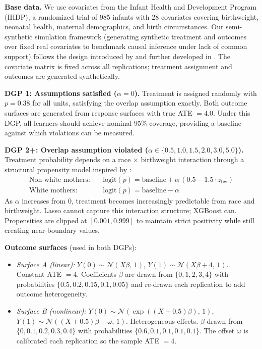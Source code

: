 \documentclass[12pt]{article}
\begin{document}
\noindent\textbf{Base data.} We use covariates from the Infant Health and Development Program (IHDP), a randomized trial of 985 infants with 28 covariates covering birthweight, neonatal health, maternal demographics, and birth circumstances. Our semi-synthetic simulation framework (generating synthetic treatment and outcomes over fixed real covariates to benchmark causal inference under lack of common support) follows the design introduced by \citet{Hill2011} and further developed in \citet{Hill2012}. The covariate matrix is fixed across all replications; treatment assignment and outcomes are generated synthetically.

\medskip
\noindent\textbf{DGP 1: Assumptions satisfied ($\alpha = 0$).} Treatment is assigned randomly with $p = 0.38$ for all units, satisfying the overlap assumption exactly. Both outcome surfaces are generated from \citet{Hill2011} response surfaces with true ATE $= 4.0$. Under this DGP, all learners should achieve nominal 95\% coverage, providing a baseline against which violations can be measured.

\medskip
\noindent\textbf{DGP 2+: Overlap assumption violated ($\alpha \in \{0.5, 1.0, 1.5, 2.0, 3.0, 5.0\}$).} Treatment probability depends on a race $\times$ birthweight interaction through a structural propensity model inspired by \citet{Hill2011}:
\begin{align*}
  \text{Non-white mothers:} &\quad \mathrm{logit}(p) = \text{baseline} + \alpha\,(0.5 - 1.5 \cdot z_{\text{bw}}) \\
  \text{White mothers:} &\quad \mathrm{logit}(p) = \text{baseline} - \alpha
\end{align*}
As $\alpha$ increases from 0, treatment becomes increasingly predictable from race and birthweight. Lasso cannot capture this interaction structure; XGBoost can. Propensities are clipped at $[0.001, 0.999]$ to maintain strict positivity while still creating near-boundary values.

\medskip
\noindent\textbf{Outcome surfaces} (used in both DGPs):

\begin{itemize}
  \item \emph{Surface A (linear):} $Y(0) \sim \mathcal{N}(X\beta,\, 1)$,\; $Y(1) \sim \mathcal{N}(X\beta + 4,\, 1)$. Constant ATE $= 4$. Coefficients $\beta$ are drawn from $\{0, 1, 2, 3, 4\}$ with probabilities $\{0.5, 0.2, 0.15, 0.1, 0.05\}$ and re-drawn each replication to add outcome heterogeneity.

  \item \emph{Surface B (nonlinear):} $Y(0) \sim \mathcal{N}(\exp((X+0.5)\beta),\, 1)$,\; $Y(1) \sim \mathcal{N}((X+0.5)\beta - \omega,\, 1)$. Heterogeneous effects. $\beta$ drawn from $\{0, 0.1, 0.2, 0.3, 0.4\}$ with probabilities $\{0.6, 0.1, 0.1, 0.1, 0.1\}$. The offset $\omega$ is calibrated each replication so the sample ATE $= 4$.
\end{itemize}
\end{document}

